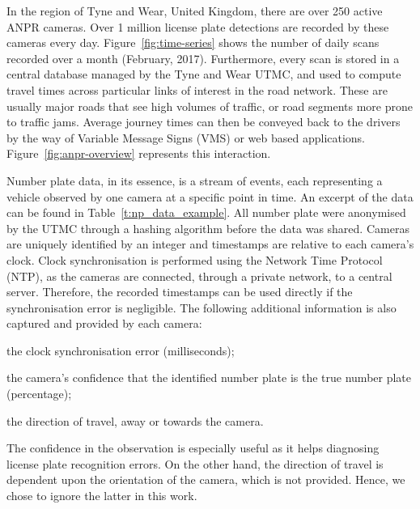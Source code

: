 In the region of Tyne and Wear, United Kingdom, there are over 250 active ANPR cameras. Over 1 million license plate detections are recorded by these cameras every day. Figure~\ref{fig:time-series} shows the number of daily scans recorded over a month (February, 2017). Furthermore, every scan is stored in a central database managed by the Tyne and Wear UTMC, and used to compute travel times across particular links of interest in the road network. These are usually major roads that see high volumes of traffic, or road segments more prone to traffic jams. Average journey times can then be conveyed back to the drivers by the way of Variable Message Signs (VMS) or web based applications. Figure~\ref{fig:anpr-overview} represents this interaction.

Number plate data, in its essence, is a stream of events, each representing a vehicle observed by one camera at a specific point in time. An excerpt of the data can be found in Table~\ref{t:np_data_example}. All number plate were anonymised by the UTMC through a hashing algorithm before the data was shared. Cameras are uniquely identified by an integer and timestamps are relative to each camera's clock. Clock synchronisation is performed using the Network Time Protocol (NTP), as the cameras are connected, through a private network, to a central server. Therefore, the recorded timestamps can be used directly if the synchronisation error is negligible. The following additional information is also captured and provided by each camera:
\begin{enumerate*}[label=(\roman*)]
  \item the clock synchronisation error (milliseconds);
  \item the camera's confidence that the identified number plate is the true number plate (percentage);
  \item the direction of travel, away or towards the camera.
\end{enumerate*}
The confidence in the observation is especially useful as it helps diagnosing license plate recognition errors. On the other hand, the direction of travel is dependent upon the orientation of the camera, which is not provided. Hence, we chose to ignore the latter in this work.

